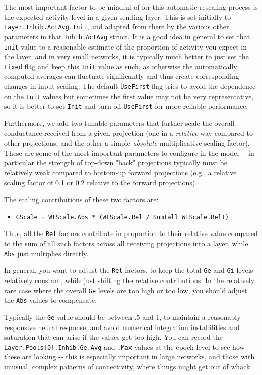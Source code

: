 The most important factor to be mindful of for this automatic rescaling
process is the expected activity level in a given sending layer. This is
set initially to \texttt{Layer.Inhib.ActAvg.Init}, and adapted from
there by the various other parameters in that \texttt{Inhib.ActAvg}
struct. It is a good idea in general to set that \texttt{Init} value to
a reasonable estimate of the proportion of activity you expect in the
layer, and in very small networks, it is typically much better to just
set the \texttt{Fixed} flag and keep this \texttt{Init} value as such,
as otherwise the automatically computed averages can fluctuate
significantly and thus create corresponding changes in input scaling.
The default \texttt{UseFirst} flag tries to avoid the dependence on the
\texttt{Init} values but sometimes the first value may not be very
representative, so it is better to set \texttt{Init} and turn off
\texttt{UseFirst} for more reliable performance.

Furthermore, we add two tunable parameters that further scale the
overall conductance received from a given projection (one in a
\emph{relative} way compared to other projections, and the other a
simple \emph{absolute} multiplicative scaling factor). These are some of
the most important parameters to configure in the model -\/- in
particular the strength of top-down "back" projections typically must be
relatively weak compared to bottom-up forward projections (e.g., a
relative scaling factor of 0.1 or 0.2 relative to the forward
projections).

The scaling contributions of these two factors are:

\begin{itemize}
\tightlist
\item
  \texttt{GScale\ =\ WtScale.Abs\ *\ (WtScale.Rel\ /\ Sum(all\ WtScale.Rel))}
\end{itemize}

Thus, all the \texttt{Rel} factors contribute in proportion to their
relative value compared to the sum of all such factors across all
receiving projections into a layer, while \texttt{Abs} just multiplies
directly.

In general, you want to adjust the \texttt{Rel} factors, to keep the
total \texttt{Ge} and \texttt{Gi} levels relatively constant, while just
shifting the relative contributions. In the relatively rare case where
the overall \texttt{Ge} levels are too high or too low, you should
adjust the \texttt{Abs} values to compensate.

Typically the \texttt{Ge} value should be between .5 and 1, to maintain
a reasonably responsive neural response, and avoid numerical integration
instabilities and saturation that can arise if the values get too high.
You can record the \texttt{Layer.Pools{[}0{]}.Inhib.Ge.Avg} and
\texttt{.Max} values at the epoch level to see how these are looking
-\/- this is especially important in large networks, and those with
unusual, complex patterns of connectivity, where things might get out of
whack.

